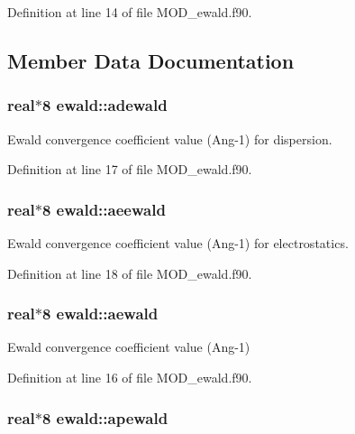 Definition at line 14 of file M\-O\-D\-\_\-ewald.\-f90.



\subsection{Member Data Documentation}
\hypertarget{classewald_a51905d59653a49a01964584ae92ff5cc}{
\subsubsection[{adewald}]{\setlength{\rightskip}{0pt plus 5cm}real$\ast$8 ewald\-::adewald}}\label{classewald_a51905d59653a49a01964584ae92ff5cc}


Ewald convergence coefficient value (Ang-\/1) for dispersion. 



Definition at line 17 of file M\-O\-D\-\_\-ewald.\-f90.

\hypertarget{classewald_ad5ce1eeff5b35e8cf29d2948e5146e5f}{
\subsubsection[{aeewald}]{\setlength{\rightskip}{0pt plus 5cm}real$\ast$8 ewald\-::aeewald}}\label{classewald_ad5ce1eeff5b35e8cf29d2948e5146e5f}


Ewald convergence coefficient value (Ang-\/1) for electrostatics. 



Definition at line 18 of file M\-O\-D\-\_\-ewald.\-f90.

\hypertarget{classewald_ae9a0f8ffb1b81515f022739140019848}{
\subsubsection[{aewald}]{\setlength{\rightskip}{0pt plus 5cm}real$\ast$8 ewald\-::aewald}}\label{classewald_ae9a0f8ffb1b81515f022739140019848}


Ewald convergence coefficient value (Ang-\/1) 



Definition at line 16 of file M\-O\-D\-\_\-ewald.\-f90.

\hypertarget{classewald_a8def5c80c49373aeac67bd04371dce79}{
\subsubsection[{apewald}]{\setlength{\rightskip}{0pt plus 5cm}real$\ast$8 ewald\-::apewald}}\label{classewald_a8def5c80c49373aeac67bd04371dce79}


